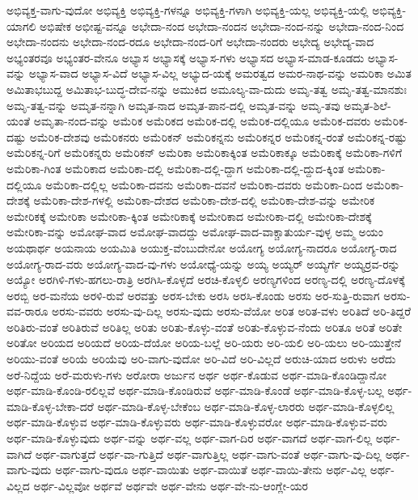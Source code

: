 {ಅಭಿವ್ಯಕ್ತ-ವಾಗು-ವುದೋ
ಅಭಿವ್ಯಕ್ತಿ
ಅಭಿವ್ಯಕ್ತಿ-ಗಳನ್ನೂ
ಅಭಿವ್ಯಕ್ತಿ-ಗಳಾಗಿ
ಅಭಿವ್ಯಕ್ತಿ-ಯಲ್ಲ
ಅಭಿವ್ಯಕ್ತಿ-ಯಲ್ಲಿ
ಅಭಿವ್ಯಕ್ತಿ-ಯಾಗಲಿ
ಅಭಿಷೇಕ
ಅಭೀಷ್ಟ-ವನ್ನೂ
ಅಭೇದಾ-ನಂದ
ಅಭೇದಾ-ನಂದನ
ಅಭೇದಾ-ನಂದ-ನನ್ನು
ಅಭೇದಾ-ನಂದ-ನಿಂದ
ಅಭೇದಾ-ನಂದನು
ಅಭೇದಾ-ನಂದ-ರದೂ
ಅಭೇದಾ-ನಂದ-ರಿಗೆ
ಅಭೇದಾ-ನಂದರು
ಅಭೇದ್ಯ
ಅಭೇದ್ಯ-ವಾದ
ಅಭ್ಯಂತರವೂ
ಅಭ್ಯಂತರ-ವೇನೂ
ಅಭ್ಯಾಸ
ಅಭ್ಯಾಸಕ್ಕೆ
ಅಭ್ಯಾಸ-ಗಳು
ಅಭ್ಯಾಸದ
ಅಭ್ಯಾಸ-ಮಾಡ-ಕೂಡದು
ಅಭ್ಯಾಸ-ವನ್ನು
ಅಭ್ಯಾಸ-ವಾದ
ಅಭ್ಯಾಸ-ವಿದೆ
ಅಭ್ಯಾಸ-ವಿಲ್ಲ
ಅಭ್ಯುದ-ಯಕ್ಕೆ
ಅಮರತ್ವದ
ಅಮರ-ನಾಥ-ವನ್ನು
ಅಮರಿಕಾ
ಅಮಿತ
ಅಮಿತಾಭಬುದ್ದ
ಅಮಿತಾಭ-ಬುದ್ಧ-ದೇವ-ನನ್ನು
ಅಮುಕಿದ
ಅಮೂಲ್ಯ-ವಾ-ದುದು
ಅಮೃ-ತತ್ವ
ಅಮೃ-ತತ್ವ-ಮಾನಶುಃ
ಅಮೃ-ತತ್ವ-ವನ್ನು
ಅಮೃತ-ನನ್ನಾಗಿ
ಅಮೃತ-ನಾದ
ಅಮೃತ-ಪಾನ-ದಲ್ಲಿ
ಅಮೃತ-ವನ್ನು
ಅಮೃ-ತವು
ಅಮೃತ-ಶಿಲೆ-ಯಂತೆ
ಅಮೃತಾ-ನಂದ-ವನ್ನು
ಅಮೆರಿಕ
ಅಮೆರಿಕದ
ಅಮೆರಿಕ-ದಲ್ಲಿ
ಅಮೆರಿಕ-ದಲ್ಲಿಯೂ
ಅಮೆರಿಕ-ದವರು
ಅಮೆರಿಕ-ದಷ್ಟು
ಅಮೆರಿಕ-ದೇಶವು
ಅಮೆರಿಕನರು
ಅಮೆರಿಕನ್
ಅಮೆರಿಕನ್ನನು
ಅಮೆರಿಕನ್ನರ
ಅಮೆರಿಕನ್ನ-ರಂತೆ
ಅಮೆರಿಕನ್ನ-ರಷ್ಟು
ಅಮೆರಿಕನ್ನ-ರಿಗೆ
ಅಮೆರಿಕನ್ನರು
ಅಮೆರಿಕನ್
ಅಮೆರಿಕಾ
ಅಮೆರಿಕಾಕ್ಕಿಂತ
ಅಮೆರಿಕಾಕ್ಕೂ
ಅಮೆರಿಕಾಕ್ಕೆ
ಅಮೆರಿಕಾ-ಗಳಿಗೆ
ಅಮೆರಿಕಾ-ಗಿಂತ
ಅಮೆರಿಕಾದ
ಅಮೆರಿಕಾ-ದಲ್ಲಿ
ಅಮೆರಿಕಾ-ದಲ್ಲಿ-ದ್ದಾಗ
ಅಮೆರಿಕಾ-ದಲ್ಲಿ-ದ್ದುದ-ಕ್ಕಿಂತ
ಅಮೆರಿಕಾ-ದಲ್ಲಿಯೂ
ಅಮೆರಿಕಾ-ದಲ್ಲಿಲ್ಲ
ಅಮೆರಿಕಾ-ದವನು
ಅಮೆರಿಕಾ-ದವನೆ
ಅಮೆರಿಕಾ-ದವರು
ಅಮೆರಿಕಾ-ದಿಂದ
ಅಮೆರಿಕಾ-ದೇಶಕ್ಕೆ
ಅಮೆರಿಕಾ-ದೇಶ-ಗಳಲ್ಲಿ
ಅಮೆರಿಕಾ-ದೇಶದ
ಅಮೆರಿಕಾ-ದೇಶ-ದಲ್ಲಿ
ಅಮೆರಿಕಾ-ದೇಶ-ವನ್ನು
ಅಮೇರಿಕ
ಅಮೇರಿಕಕ್ಕೆ
ಅಮೇರಿಕಾ
ಅಮೇರಿಕಾ-ಕ್ಕಿಂತ
ಅಮೇರಿಕಾಕ್ಕೆ
ಅಮೇರಿಕಾದ
ಅಮೇರಿಕಾ-ದಲ್ಲಿ
ಅಮೇರಿಕಾ-ದೇಶಕ್ಕೆ
ಅಮೇರಿಕಾ-ವನ್ನು
ಅಮೋಘ-ವಾದ
ಅಮೋಘ-ವಾದದ್ದು
ಅಮೋಘ-ವಾದ-ವಾಕ್ಚಾತುರ್ಯ-ವುಳ್ಳ
ಅಮ್ಮ
ಅಯಂ
ಅಯಥಾರ್ಥ
ಅಯನಾಯ
ಅಯಮಿತಿ
ಅಯುಕ್ತ-ವೆಂಬುದೇನೋ
ಅಯೋಗ್ಯ
ಅಯೋಗ್ಯ-ನಾದರೂ
ಅಯೋಗ್ಯ-ರಾದ
ಅಯೋಗ್ಯ-ರಾದ-ವರು
ಅಯೋಗ್ಯ-ವಾದ-ವು-ಗಳು
ಅಯೋಧ್ಯೆ-ಯನ್ನು
ಅಯ್ಯ
ಅಯ್ಯರ್
ಅಯ್ಯರ್ಗೆ
ಅಯ್ಯರ್ರವ-ರನ್ನು
ಅಯ್ಯೋ
ಅರಗಿಳಿ-ಗಳು-ಹಗಲು-ರಾತ್ರಿ
ಅರಗಿಸಿ-ಕೊಳ್ಳದೆ
ಅರಚಿ-ಕೊಳ್ಳಲಿ
ಅರಣ್ಯಗಳಿಂದ
ಅರಣ್ಯ-ದಲ್ಲಿ
ಅರಣ್ಯ-ದೊಳಕ್ಕೆ
ಅರಬ್ಬಿ
ಅರ-ಮನೆಯ
ಅರಳಿ-ರುವೆ
ಅರವತ್ತು
ಅರಸ-ಬೇಕು
ಅರಸಿ
ಅರಸಿ-ಕೊಂಡು
ಅರಸು
ಅರ-ಸುತ್ತಿ-ರುವಾಗ
ಅರಸು-ವವ-ರಾರೂ
ಅರಸು-ವವರು
ಅರಸು-ವು-ದಿಲ್ಲ
ಅರಸು-ವುದು
ಅರಸು-ವೆಯೋ
ಅರಿತ
ಅರಿತ-ವಳು
ಅರಿತಿದೆ
ಅರಿ-ತಿದ್ದರೆ
ಅರಿತಿರು-ವಂತೆ
ಅರಿತಿರುವೆ
ಅರಿತಿಲ್ಲ
ಅರಿತು
ಅರಿತು-ಕೊಳ್ಳು-ವಂತೆ
ಅರಿತು-ಕೊಳ್ಳುವ-ನೆಂದು
ಅರಿತೂ
ಅರಿತೆ
ಅರಿತೇ
ಅರಿತೋ
ಅರಿಯದ
ಅರಿಯದೆ
ಅರಿಯ-ದೆಯೋ
ಅರಿಯ-ಬಲ್ಲೆ
ಅರಿ-ಯರು
ಅರಿ-ಯಲಿ
ಅರಿ-ಯಲು
ಅರಿ-ಯುತ್ತೇನೆ
ಅರಿಯು-ವಂತೆ
ಅರಿಯೆ
ಅರಿಯೆವು
ಅರಿ-ವಾಗು-ವುದೋ
ಅರಿ-ವಿದೆ
ಅರಿ-ವಿಲ್ಲದೆ
ಅರುಚಿ-ಯಾದ
ಅರುಳು
ಅರೆದು
ಅರೆ-ನಿದ್ದೆಯ
ಅರೆ-ಮರುಳು-ಗಳು
ಅರೋರಾ
ಅರ್ಜುನ
ಅರ್ಥ
ಅರ್ಥ-ಕೊಡುವ
ಅರ್ಥ-ಮಾಡಿ-ಕೊಂಡಿದ್ದಾನೋ
ಅರ್ಥ-ಮಾಡಿ-ಕೊಂಡಿ-ರಲಿಲ್ಲವೆ
ಅರ್ಥ-ಮಾಡಿ-ಕೊಂಡಿರುವೆ
ಅರ್ಥ-ಮಾಡಿ-ಕೊಂಡೆ
ಅರ್ಥ-ಮಾಡಿ-ಕೊಳ್ಳ-ಬಲ್ಲ
ಅರ್ಥ-ಮಾಡಿ-ಕೊಳ್ಳ-ಬೇಕಾ-ದರೆ
ಅರ್ಥ-ಮಾಡಿ-ಕೊಳ್ಳ-ಬೇಕೆಂಬ
ಅರ್ಥ-ಮಾಡಿ-ಕೊಳ್ಳ-ಲಾರರು
ಅರ್ಥ-ಮಾಡಿ-ಕೊಳ್ಳಲಿಲ್ಲ
ಅರ್ಥ-ಮಾಡಿ-ಕೊಳ್ಳುವ
ಅರ್ಥ-ಮಾಡಿ-ಕೊಳ್ಳುವರು
ಅರ್ಥ-ಮಾಡಿ-ಕೊಳ್ಳುವರೋ
ಅರ್ಥ-ಮಾಡಿ-ಕೊಳ್ಳುವ-ವರು
ಅರ್ಥ-ಮಾಡಿ-ಕೊಳ್ಳುವುದು
ಅರ್ಥ-ವನ್ನು
ಅರ್ಥ-ವಲ್ಲ
ಅರ್ಥ-ವಾಗ-ದಿರ
ಅರ್ಥ-ವಾಗದೆ
ಅರ್ಥ-ವಾಗ-ಲಿಲ್ಲ
ಅರ್ಥ-ವಾಗಿದೆ
ಅರ್ಥ-ವಾಗುತ್ತದೆ
ಅರ್ಥ-ವಾ-ಗುತ್ತಿದೆ
ಅರ್ಥ-ವಾಗುತ್ತಿಲ್ಲ
ಅರ್ಥ-ವಾಗು-ವಂತೆ
ಅರ್ಥ-ವಾಗು-ವು-ದಿಲ್ಲ
ಅರ್ಥ-ವಾಗು-ವುದು
ಅರ್ಥ-ವಾಗು-ವುದೂ
ಅರ್ಥ-ವಾಯಿತು
ಅರ್ಥ-ವಾಯಿತೆ
ಅರ್ಥ-ವಾಯಿ-ತೇನು
ಅರ್ಥ-ವಿಲ್ಲ
ಅರ್ಥ-ವಿಲ್ಲದ
ಅರ್ಥ-ವಿಲ್ಲವೋ
ಅರ್ಥವೆ
ಅರ್ಥವೇ
ಅರ್ಥ-ವೇನು
ಅರ್ಥ-ವೇ-ನು-ಆಂಗ್ಲೇ-ಯರ
}

